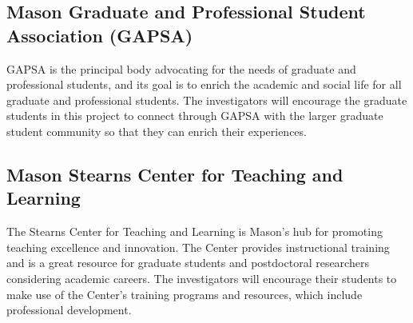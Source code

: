 \documentclass[11pt]{article}
\begin{document}
\subsection*{Mason Graduate and Professional Student Association (GAPSA)}  GAPSA is the principal body advocating for the needs of graduate and professional students, and its goal is to enrich the academic and social life for all graduate and professional students. The investigators will encourage the graduate students in this project to connect through GAPSA with the larger graduate student community so that they can enrich their experiences. 

\subsection*{Mason Stearns Center for Teaching and Learning} The Stearns Center for Teaching and Learning is Mason’s hub for promoting teaching excellence and innovation. The Center provides instructional training and is a great resource for graduate students and postdoctoral researchers considering academic careers. The investigators will encourage their students to make use of the Center's training programs and resources, which include professional development.
\end{document}
